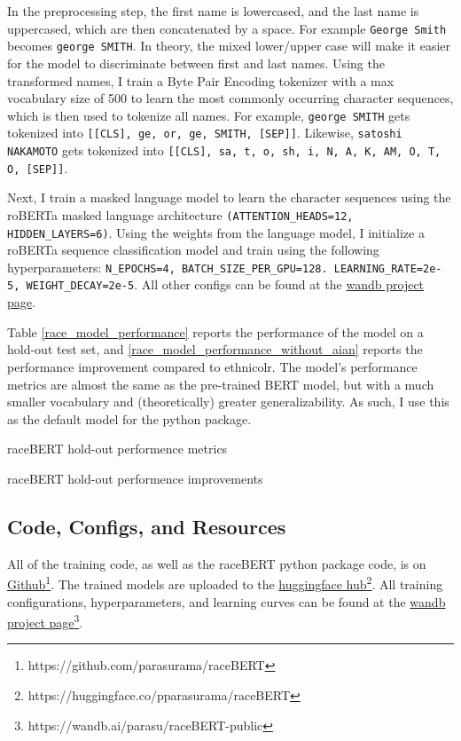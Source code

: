 \documentclass[11pt]{article}
\begin{document}
In the preprocessing step, the first name is lowercased, and the last name is uppercased, which are then concatenated by a space.
For example \texttt{George Smith} becomes \texttt{george SMITH}. 
In theory, the mixed lower/upper case will make it easier for the model to discriminate between first and last names.
Using the transformed names, I train a Byte Pair Encoding tokenizer with a max vocabulary size of 500 to learn the most commonly occurring character sequences, which is then used to tokenize all names.
For example, \texttt{george SMITH} gets tokenized into \texttt{[[CLS], ge, or, ge, SMITH, [SEP]]}.
Likewise, \texttt{satoshi NAKAMOTO} gets tokenized into \texttt{[[CLS], sa, t, o, sh, i, N, A, K, AM, O, T, O, [SEP]]}.

Next, I train a masked language model to learn the character sequences using the roBERTa masked language architecture \texttt{(ATTENTION\_HEADS=12, HIDDEN\_LAYERS=6)}. 
Using the weights from the language model, I initialize a roBERTa sequence classification model and train using the following hyperparameters: \texttt{N\_EPOCHS=4, BATCH\_SIZE\_PER\_GPU=128. LEARNING\_RATE=2e-5, WEIGHT\_DECAY=2e-5}.
All other configs can be found at the \href{https://wandb.ai/parasu/raceBERT-public/runs/39jr1hrc/overview}{wandb project page}.

Table \ref{race_model_performance} reports the performance of the model on a hold-out test set, and \autoref{race_model_performance_without_aian} reports the performance improvement compared to ethnicolr.
The model's performance metrics are almost the same as the pre-trained BERT model, but with a much smaller vocabulary and (theoretically) greater generalizability.
As such, I use this as the default model for the python package.

\begin{table}[H]
 \centering
 
 \caption{raceBERT hold-out performence metrics}
 \label{race_model_performance}
\end{table}

\begin{table}[H]
 \centering
 
 \caption{raceBERT hold-out performence improvements}
 \label{race_model_performance_without_aian}
\end{table}

\subsection{Code, Configs, and Resources}
All of the training code, as well as the raceBERT python package code, is on \href{https://github.com/parasurama/raceBERT}{Github}\footnote{https://github.com/parasurama/raceBERT}.
The trained models are uploaded to the \href{https://huggingface.co/pparasurama/raceBERT}{huggingface hub}\footnote{https://huggingface.co/pparasurama/raceBERT}.
All training configurations, hyperparameters, and learning curves can be found at the \href{https://wandb.ai/parasu/raceBERT-public}{wandb project page}\footnote{https://wandb.ai/parasu/raceBERT-public}.
\end{document}
